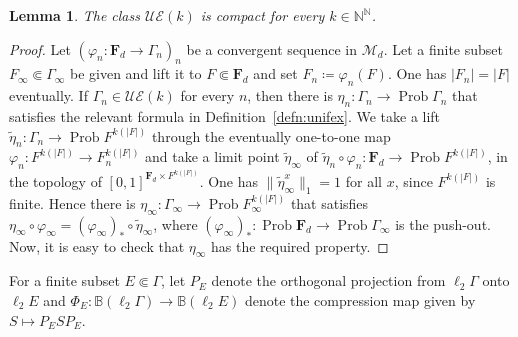 \documentclass[12pt,nosumlimits,nonamelimits]{amsart}
\newtheorem{lem}[thm]{Lemma}
\theoremstyle{remark}
\theoremstyle{definition}
\newcommand{\IB}{\mathbb{B}}
\newcommand{\IN}{\mathbb{N}}
\newcommand{\bF}{\mathbf{F}}
\newcommand{\cM}{\mathcal{M}}
\newcommand{\vp}{\varphi}
\newcommand{\Ga}{\Gamma}
\newcommand{\UE}{\mathcal{UE}}
\DeclareMathOperator{\Prob}{Prob}
\begin{document}
\begin{lem}
The class $\UE(k)$ is compact for every $k\in\IN^\IN$.
\end{lem}
\begin{proof}
Let $(\vp_n\colon\bF_d\to\Ga_n)_n$ be a convergent sequence 
in $\cM_d$. 
Let a finite subset $F_\infty\Subset \Ga_\infty$ be given 
and  lift it to $F\Subset\bF_d$ and set $F_n \coloneq \vp_n(F)$. 
One has $|F_n| = |F|$ eventually.  
If $\Ga_n\in\UE(k)$ for every $n$, then there is 
$\eta_n\colon \Ga_n\to \Prob \Ga_n$ that 
satisfies the relevant formula in Definition~\ref{defn:unifex}. 
We take a lift $\tilde{\eta}_n\colon \Ga_n\to \Prob {F^{k(|F|)}}$ 
through the eventually one-to-one map 
$\vp_n\colon F^{k(|F|)} \to F_n^{k(|F|)}$ 
and take a limit point $\tilde{\eta}_\infty$ 
of $\tilde{\eta}_n\circ\vp_n\colon\bF_d\to \Prob {F^{k(|F|)}}$, 
in the topology of $[0,1]^{\bF_d \times F^{k(|F|)}}$.
One has $\|\tilde{\eta}_\infty^x\|_1 = 1$ for all $x$, 
since $F^{k(|F|)}$ is finite. 
Hence there is $\eta_\infty\colon \Ga_\infty \to \Prob F_\infty^{k(|F|)}$ 
that satisfies $\eta_\infty\circ\vp_\infty = (\vp_\infty)_*\circ\tilde{\eta}_\infty$, 
where $ (\vp_\infty)_*\colon \Prob \bF_d \to \Prob \Ga_\infty$ is the push-out. 
Now, it is easy to check that $\eta_\infty$ has the required property.
\end{proof}

For a finite subset $E\Subset\Ga$, 
let $P_E$ denote the orthogonal projection 
from $\ell_2\Ga$ onto $\ell_2E$ and 
$\Phi_E\colon \IB(\ell_2\Ga)\to \IB(\ell_2E)$ denote 
the compression map given by $S\mapsto P_ESP_E$. 
\end{document}
